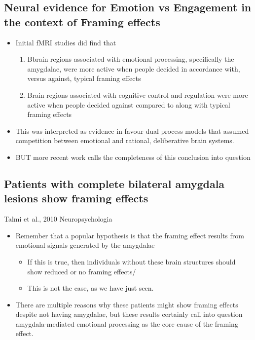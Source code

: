 \subsection{Neural evidence for Emotion vs Engagement in the context of Framing effects}
\begin{itemize}
    \item Initial fMRI studies did find that
    \begin{enumerate}
        \item Bbrain regions associated with emotional processing, specifically the amygdalae, were more active when people decided in accordance with, versus against, typical framing effects
        \item Brain regions associated with cognitive control and regulation were more active when people decided against compared to along with typical framing effects
    \end{enumerate}
    \item This was interpreted as evidence in favour dual-process models that assumed competition between emotional and rational, deliberative brain systems.
    \item BUT more recent work calls the completeness of this conclusion into question
\end{itemize}
\subsection{Patients with complete bilateral amygdala lesions show framing effects}
Talmi et al., 2010 Neuropsychologia
\begin{itemize}
    \item Remember that a popular hypothesis is that the framing effect results from emotional signals generated by the amygdalae
    \begin{itemize}
        \item If this is true, then individuals without these brain structures should show reduced or no framing effects/
        \item This is not the case, as we have just seen.
    \end{itemize}
    \item There are multiple reasons why these patients might show framing effects despite not having amygdalae, but these results certainly call into question amygdala-mediated emotional processing as the core cause of the framing effect.
\end{itemize}
